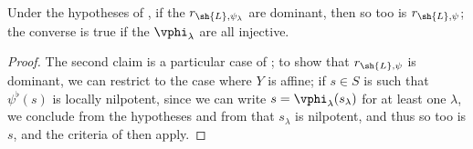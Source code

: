 \begin{corollary}[3.7.8]
\label{II.3.7.8}
Under the hypotheses of , if the $r_{\sh{L},\psi_\lambda}$ are dominant, then so too is $r_{\sh{L},\psi}$;
the converse is true if the $\vphi_\lambda$ are all injective.
\end{corollary}

\begin{proof}
The second claim is a particular case of ;
to show that $r_{\sh{L},\psi}$ is dominant, we can restrict to the case where $Y$ is affine;
if $s\in S$ is such that $\psi^\flat(s)$ is locally nilpotent, since we can write $s=\vphi_\lambda(s_\lambda)$ for at least one $\lambda$, we conclude from the hypotheses and from  that $s_\lambda$ is nilpotent, and thus so too is $s$, and the criteria of  then apply.
\end{proof}


